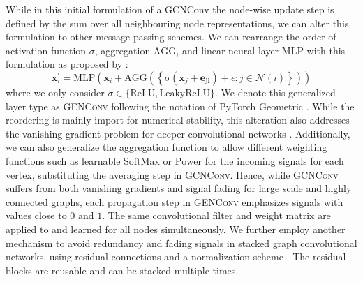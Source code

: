 \documentclass{bioinfo}
\renewcommand{\cite}{\citep}
\begin{document}
While in this initial formulation of a GCNConv the node-wise update
step is defined by the sum over all neighbouring node representations,
we can alter this formulation to other message passing schemes.  We
can rearrange the order of activation function $\sigma$, aggregation
$\mathrm{AGG}$, and linear neural layer $\mathrm{MLP}$ with this
formulation as proposed by \citet{GENConv2020}:
\begin{equation}
	\mathbf{x}_i^{\prime} = \mathrm{MLP} \left( \mathbf{x}_i +
	\mathrm{AGG} \left( \left\{
	\mathrm{\sigma} \left( \mathbf{x}_j + \mathbf{e_{ji}} \right) +\epsilon
	: j \in \mathcal{N}(i) \right\} \right)
	\right)
\end{equation}
where we only consider
$\sigma \in \{\mathrm{ReLU}, \mathrm{LeakyReLU}\}$. We denote this
generalized layer type as \textsc{GENConv} following the notation of
PyTorch Geometric \cite{PytorchGeometric}.  While the reordering is
mainly import for numerical stability, this alteration also addresses
the vanishing gradient problem for deeper convolutional networks
\cite{GENConv2020}. Additionally, we can also generalize the
aggregation function to allow different weighting functions such as
learnable $\mathrm{SoftMax}$ or $\mathrm{Power}$ for the incoming
signals for each vertex, substituting the averaging step in
\textsc{GCNConv}. Hence, while \textsc{GCNConv} suffers from both
vanishing gradients and signal fading for large scale and highly
connected graphs, each propagation step in \textsc{GENConv} emphasizes
signals with values close to $0$ and $1$. The same convolutional
filter and weight matrix are applied to and learned for all nodes
simultaneously. %
We further employ another mechanism to avoid redundancy and fading
signals in stacked graph convolutional networks, using residual
connections and a normalization scheme \cite{DeepGCN2019,
  DeeperGCN2020}.  The residual blocks are reusable and can be stacked
multiple times. %

\end{document}
